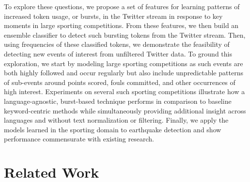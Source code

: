 \documentclass{acm_proc_article-sp}
\begin{document}
To explore these questions, we propose a set of features for learning patterns of increased token usage, or bursts, in the Twitter stream in response to key moments in large sporting competitions.
From these features, we then build an ensemble classifier to detect such bursting tokens from the Twitter stream.
Then, using frequencies of these classified tokens, we demonstrate the feasibility of detecting new events of interest from unfiltered Twitter data.
To ground this exploration, we start by modeling large sporting competitions as such events are both highly followed and occur regularly but also include unpredictable patterns of sub-events around points scored, fouls committed, and other occurrences of high interest.
Experiments on several such sporting competitions illustrate how a language-agnostic, burst-based technique performs in comparison to baseline keyword-centric methods while simultaneously providing additional insight across languages and without text normalization or filtering.
Finally, we apply the models learned in the sporting domain to earthquake detection and show performance commensurate with existing research.


\section{Related Work}
\label{sect:relatedWork}
\end{document}
